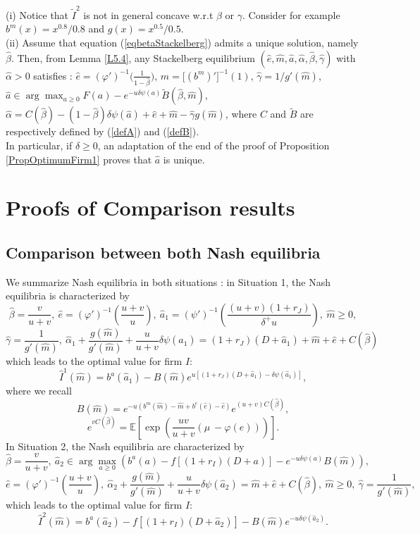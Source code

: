 \documentclass{svjour3}
\begin{document}
\begin{remark}
(i)
Notice that $\tilde I^2$ is not in general concave w.r.t $\beta$ or $\gamma$. Consider for example $b^m(x)=x^{0.8}/0.8$ and $g(x)=x^{0.5}/0.5$.
\\
(ii)
 Assume that equation (\ref{eqbetaStackelberg}) admits a unique solution, namely $\hat\beta$. Then, from Lemma \ref{L5.4},
any 
Stackelberg equilibrium $(\hat e,\hat m,\hat a,\hat\alpha,\hat\beta,\hat\gamma)$ with $\hat\alpha>0$ satisfies : 
$\hat e=(\varphi')^{-1}\Big(\frac{1}{1-\hat\beta}\Big)$, $\hat m=\big[(b^m)'\big]^{-1}(1)$, $\hat\gamma=1/g'(\hat m)$,
\\
 $\hat a\in\arg\max_{a\geq 0} F(a)-e^{-u\delta\psi(a)}\tilde B(\hat\beta,\hat m)$, $\hat\alpha=C(\hat\beta)-(1-\hat\beta)\delta\psi(\hat a)+\hat e+\hat m-\hat\gamma g(\hat m)$, where $C$ and $\tilde B$ are respectively defined by (\ref{defA}) and (\ref{defB}). 
\\
In particular, if $\delta\geq 0$, an adaptation of the end of the proof of Proposition \ref{PropOptimumFirm1} proves that $\hat a$ is unique. 
 \end{remark}

\section{Proofs of Comparison  results}
\label{sec:proof3}

\subsection{Comparison between both Nash equilibria}
\label{comp}

We summarize Nash equilibria in both situations : in Situation 1, the Nash equilibria is characterized by
$$
\hat\beta=\frac{v}{u+v},~\hat e=(\varphi')^{-1}(\frac{u+v}{u}),~\hat a_1=
(\psi')^{-1}\left(\frac{(u+v)(1+r_J)}{\delta^+ u}\right),~\hat m\geq 0, $$
 $$\hat \gamma=\frac{1}{g'(\hat m)}, ~ \hat\alpha_1+\frac{g(\hat m)}{g'(\hat m)}+\frac{u}{u+v}\delta\psi(\hat a_1)=(1+r_J)(D+\hat a_1)+\hat m+\hat e+C( \hat \beta)$$
  which leads to the optimal value for firm $I$:
 $$\hat I^1(\hat m)=b^a(\hat a_1)-
 {B(\hat m)}e^{u[(1+r_J)(D+\hat a_1)-\delta\psi(\hat a_1)]}
 , $$
  where we recall
$${B(\hat m)}= e^{-u(b^m(\hat m)-\hat m+b^{e}(\hat e)-\hat e)}e^{(u+v) C( \hat \beta)},$$
$$e^{v C( \hat \beta)}={\mathbb{E}}\left[ \exp(\frac{uv}{u+v}(\mu~-\varphi(\hat e)))\right].$$
  In Situation 2, the Nash equilibria are characterized by
$$
\hat\beta=\frac{v}{u+v},~
\hat a_2\in\arg\max_{a\geq 0} \left(b^a(a)-f[(1+r_I)(D+a)]-e^{-u\delta\psi(a)}B(\hat m)\right), $$
 $$\hat e=(\varphi')^{-1}(\frac{u+v}{u}),~ \hat\alpha_2+\frac{g(\hat m)}{g'(\hat m)}+\frac{u}{u+v}\delta\psi(\hat a_2)=\hat m+\hat e+ C( \hat \beta),~\hat m\geq 0,~ \hat \gamma=\frac{1}{g'(\hat m)},$$
 which leads to the optimal value for firm $I$:
  $$\hat I^2(\hat m)=b^a(\hat a_2)
-f[(1+r_I)(D+\hat a_2)]-{B(\hat m)}e^{-u\delta\psi(\hat a_2)}.$$
\end{document}
